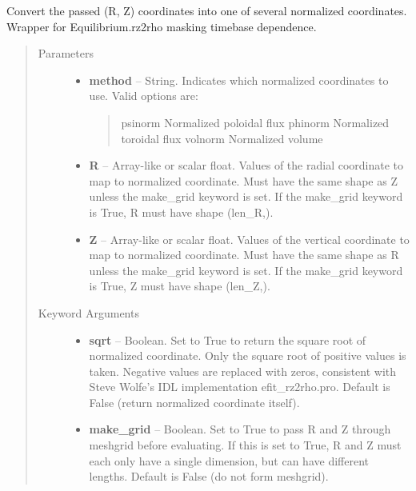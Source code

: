 \documentclass[letterpaper,10pt,english]{sphinxmanual}
\begin{document}
\begin{fulllineitems}
\begin{fulllineitems}
\label{eqtools:eqtools.eqdskreader.EqdskReader.rz2rho}
Convert the passed (R, Z) coordinates into one of several normalized coordinates.
Wrapper for Equilibrium.rz2rho masking timebase dependence.
\begin{quote}\begin{description}
\item[{Parameters }] \leavevmode\begin{itemize}
\item {} 
\textbf{method} --
String. Indicates which normalized coordinates to use.
Valid options are:
\begin{quote}

psinorm     Normalized poloidal flux
phinorm     Normalized toroidal flux
volnorm     Normalized volume
\end{quote}

\item {} 
\textbf{R} --
Array-like or scalar float. Values of the radial coordinate to
map to normalized coordinate. Must have the same shape as Z
unless the make\_grid keyword is set. If the make\_grid keyword
is True, R must have shape (len\_R,).

\item {} 
\textbf{Z} --
Array-like or scalar float. Values of the vertical coordinate to
map to normalized coordinate. Must have the same shape as R
unless the make\_grid keyword is set. If the make\_grid keyword
is True, Z must have shape (len\_Z,).

\end{itemize}

\item[{Keyword Arguments}] \leavevmode\begin{itemize}
\item {} 
\textbf{sqrt} --
Boolean. Set to True to return the square root of normalized
coordinate. Only the square root of positive values is taken.
Negative values are replaced with zeros, consistent with Steve
Wolfe's IDL implementation efit\_rz2rho.pro. Default is False
(return normalized coordinate itself).

\item {} 
\textbf{make\_grid} --
Boolean. Set to True to pass R and Z through meshgrid
before evaluating. If this is set to True, R and Z must each
only have a single dimension, but can have different lengths.
Default is False (do not form meshgrid).


\end{itemize}
\end{description}
\end{quote}
\end{fulllineitems}
\end{fulllineitems}
\end{document}
